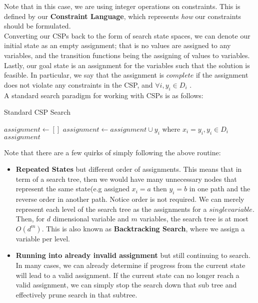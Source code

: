 \documentclass[12pt]{article}
\begin{document}
Note that in this case, we are using integer operations on constraints. This is defined by our \textbf{Constraint Language}, which represents \textit{how} our constraints should be formulated.\\

Converting our CSPs back to the form of search state spaces, we can denote our initial state as an empty assignment; that is no values are assigned to any variables, and the transition functions being the assigning of values to variables. Lastly, our goal state is an assignment for the variables such that the solution is feasible. In particular, we say that the assignment is $complete$ if the assignment does not violate any constraints in the CSP, and $\forall i, y_i \in D_i$ .\\

A standard search paradigm for working with CSPs is as follows:

\begin{algorithm}
\caption{Standard CSP Search}\label{euclid}
\begin{algorithmic}[1]
\State $assignment \leftarrow []$
\State $assignment \leftarrow assignment \cup {y_i}$ where $x_i = y_i, y_i \in D_i$
\State {} 
	\Return $assignment$
\EndIf
\EndWhile
\end{algorithmic}
\end{algorithm}

Note that there are a few quirks of simply following the above routine:
\begin{itemize}
\item \textbf{Repeated States} but different order of assignments. This means that in term of a search tree, then we would have many unnecessary nodes that represent the same state(e.g assigned $x_i = a$ then $y_i = b$ in one path and the reverse order in another path. Notice order is not required. We can merely represent each level of the search tree as the assignments for a $single variable$. Then, for $d$ dimensional variable and $m$ variables, the search tree is at most $O(d^m)$. This is also known as \textbf{Backtracking Search}, where we assign a variable per level.

\item \textbf{Running into already invalid assignment} but still continuing to search. In many cases, we can already determine if progress from the current state will lead to a valid assignment. If the current state can no longer reach a valid assignment, we can simply stop the search down that sub tree and effectively prune search in that subtree.
\end{itemize}
\end{document}
